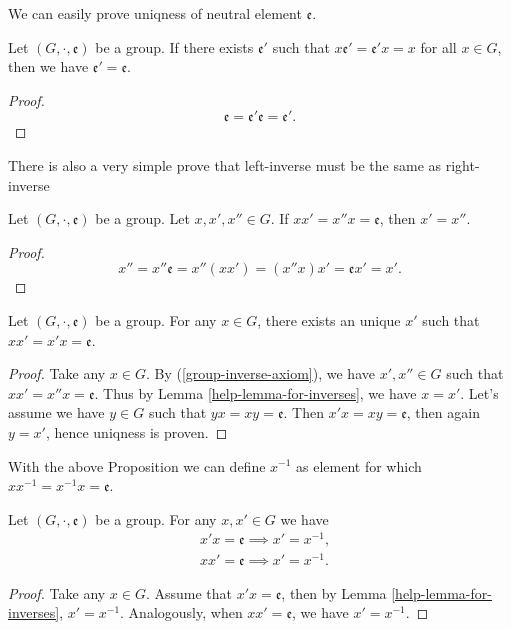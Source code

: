\documentclass[main.tex]{subfiles}
\begin{document}
We can easily prove uniqness of neutral element $\mathfrak{e}$.

\begin{proposition}
Let $(G, \cdot, \mathfrak{e})$ be a group. If there exists $\mathfrak{e}'$ such that $x\mathfrak{e}' = \mathfrak{e}'x = x$ for all $x\in G$, then we have $\mathfrak{e}' = \mathfrak{e}$.
\end{proposition}

\begin{proof}
\begin{equation}
\mathfrak{e} = \mathfrak{e}'\mathfrak{e} = \mathfrak{e}'.
\end{equation}
\end{proof}

There is also a very simple prove that left-inverse must be the same as right-inverse
\begin{lemma}
\label{help-lemma-for-inverses}
Let $(G, \cdot, \mathfrak{e})$ be a group. Let $x, x', x''\in G$. If $xx'=x''x=\mathfrak{e}$, then $x' = x''$.
\end{lemma}
\begin{proof}
\begin{equation}
x'' = x''\mathfrak{e} = x''(xx') = (x''x)x' = \mathfrak{e} x' = x'.
\end{equation}
\end{proof}
\begin{proposition}
Let $(G, \cdot, \mathfrak{e})$ be a group. For any $x\in G$, there exists an unique $x'$ such that $xx'= x'x = \mathfrak{e}$.
\end{proposition}
\begin{proof}
Take any $x\in G$. By (\ref{group-inverse-axiom}), we have $x', x''\in G$ such that $xx'=x''x=\mathfrak{e}$. 
Thus by Lemma \ref{help-lemma-for-inverses}, we have $x = x'$. Let's assume we have $y\in G$ such that $yx = xy = \mathfrak{e}$. Then $x'x = xy = \mathfrak{e}$, then again $y = x'$, hence uniqness is proven.
\end{proof}

With the above Proposition we can define $x^{-1}$ as element for which $xx^{-1} = x^{-1} x = \mathfrak{e}$.

\begin{proposition}
Let $(G, \cdot, \mathfrak{e})$ be a group. For any $x, x'\in G$ we have
\begin{align}
& x'x = \mathfrak{e} \implies x' = x^{-1},\\
& xx' = \mathfrak{e} \implies x' = x^{-1}.
\end{align}
\end{proposition}
\begin{proof}
Take any $x\in G$. Assume that $x' x = \mathfrak{e}$, then by Lemma \ref{help-lemma-for-inverses}, $x' = x^{-1}$. Analogously, when $x x' = \mathfrak{e}$, we have $x' = x^{-1}$.
\end{proof}
\end{document}
